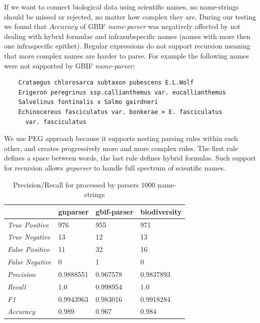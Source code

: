 \documentclass{bmcart}
\begin{document}
If we want to connect biological data using scientific names, no name-strings
should be missed or rejected, no matter how complex they are. During our
testing we found that $Accuracy$ of GBIF \textit{name-parser} was negatively
affected by not dealing with hybrid formulae and infrasubspecific names (names
with more then one infraspecific epithet). Regular expressions do not support
recursion meaning that more complex names are harder to parse.  For example the
following names were not supported by GBIF \textit{name-parser}:

\vspace{0.5cm}

\begin{verbatim}
    Crataegus chlorosarca subtaxon pubescens E.L.Wolf
    Erigeron peregrinus ssp.callianthemus var. eucallianthemus
    Salvelinus fontinalis x Salmo gairdneri
    Echinocereus fasciculatus var. bonkerae × E. fasciculatus
      var. fasciculatus
\end{verbatim}

\vspace{0.5cm}

We use PEG approach because it supports nesting parsing rules within each other,
and creates progressively more and more complex rules. The first rule defines a
space between words, the last rule defines hybrid formulas.  Such support for
recursion allows \textit{gnparser} to handle full spectrum of scientific names.

\begin{table}[htb]
  \begin{center}
    \caption{Precision/Recall for processed by parsers 1000
    name-strings}\label{table:precision}
    \resizebox{10cm}{!} {
    \begin{tabular}{|l|*{3}{l}|}
      \hline
                             & gnparser & gbif-parser & biodiversity \\
      \hline
      \textit{True Positive} & 976      & 955         & 971          \\
      \textit{True Negative} & 13       & 12          & 13           \\
      \textit{False Positive}& 11       & 32          & 16           \\
      \textit{False Negative}& 0        & 1           & 0            \\
      \textit{Precision}     & 0.9888551& 0.967578    & 0.9837893    \\
      \textit{Recall}        & 1.0      & 0.998954    & 1.0          \\
      \textit{F1}            & 0.9943963& 0.983016    & 0.9918284    \\
      \textit{Accuracy}      & 0.989    & 0.967       & 0.984        \\
      \hline
    \end{tabular}
    }
  \end{center}
\end{table}
\end{document}
